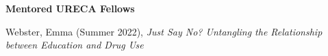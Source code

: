 {\large\textbf{Mentored URECA Fellows}}
\begin{etaremune}%
\item Webster, Emma (Summer 2022), \textit{Just Say No? Untangling the Relationship between Education and Drug Use}%
\end{etaremune}%
